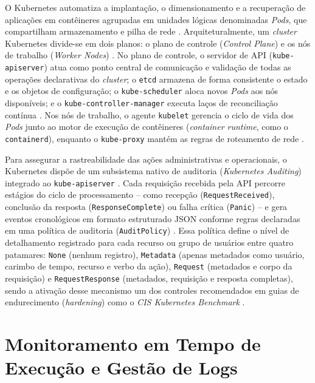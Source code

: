 O Kubernetes automatiza a implantação, o dimensionamento e a recuperação de aplicações em contêineres agrupadas em unidades lógicas denominadas \textit{Pods}, que compartilham armazenamento e pilha de rede \cite{kubernetes2025}. Arquiteturalmente, um \textit{cluster} Kubernetes divide-se em dois planos: o plano de controle (\textit{Control Plane}) e os nós de trabalho (\textit{Worker Nodes}) \cite{kubernetes2025}. No plano de controle, o servidor de API (\texttt{kube-apiserver}) atua como ponto central de comunicação e validação de todas as operações declarativas do \textit{cluster}; o \texttt{etcd} armazena de forma consistente o estado e os objetos de configuração; o \texttt{kube-scheduler} aloca novos \textit{Pods} aos nós disponíveis; e o \texttt{kube-controller-manager} executa laços de reconciliação contínua \cite{kubernetes2025}. Nos nós de trabalho, o agente \texttt{kubelet} gerencia o ciclo de vida dos \textit{Pods} junto ao motor de execução de contêineres (\textit{container runtime}, como o \texttt{containerd}), enquanto o \texttt{kube-proxy} mantém as regras de roteamento de rede \cite{kubernetes2025}.

Para assegurar a rastreabilidade das ações administrativas e operacionais, o Kubernetes dispõe de um subsistema nativo de auditoria (\textit{Kubernetes Auditing}) integrado ao \texttt{kube-apiserver} \cite{kubernetes2025}. Cada requisição recebida pela API percorre estágios do ciclo de processamento -- como recepção (\texttt{RequestReceived}), conclusão da resposta (\texttt{ResponseComplete}) ou falha crítica (\texttt{Panic}) -- e gera eventos cronológicos em formato estruturado JSON conforme regras declaradas em uma política de auditoria (\texttt{AuditPolicy}) \cite{kubernetes2025}. Essa política define o nível de detalhamento registrado para cada recurso ou grupo de usuários entre quatro patamares: \texttt{None} (nenhum registro), \texttt{Metadata} (apenas metadados como usuário, carimbo de tempo, recurso e verbo da ação), \texttt{Request} (metadados e corpo da requisição) e \texttt{RequestResponse} (metadados, requisição e resposta completas), sendo a ativação desse mecanismo um dos controles recomendados em guias de endurecimento (\textit{hardening}) como o \textit{CIS Kubernetes Benchmark} \cite{kubernetes2025}.

\section{Monitoramento em Tempo de Execução e Gestão de Logs}
\label{sec:ref_monitoramento_logs}

